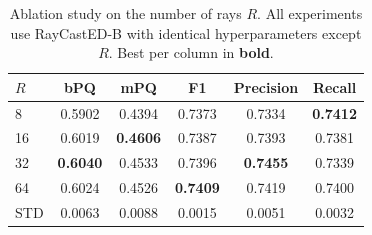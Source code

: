 \begin{table}[H]
	\centering
	\caption{Ablation study on the number of rays $R$. All experiments use RayCastED-B with identical hyperparameters except $R$. Best per column in \textbf{bold}.}
	\label{tab:ablation-rays}
	\small
	\begin{tabular}{lccccc}
		\hline
		\textbf{$R$} & \textbf{bPQ} & \textbf{mPQ} & \textbf{F1} & \textbf{Precision} & \textbf{Recall} \\
		\hline
		 8 & 0.5902 & 0.4394 & 0.7373 & 0.7334 & \textbf{0.7412} \\
		16 & 0.6019 & \textbf{0.4606} & 0.7387 & 0.7393 & 0.7381 \\
		32 & \textbf{0.6040} & 0.4533 & 0.7396 & \textbf{0.7455} & 0.7339 \\
		64 & 0.6024 & 0.4526 & \textbf{0.7409} & 0.7419 & 0.7400 \\
		\hline
		STD & 0.0063 & 0.0088 & 0.0015 & 0.0051 & 0.0032 \\
		\hline
	\end{tabular}
\end{table}
